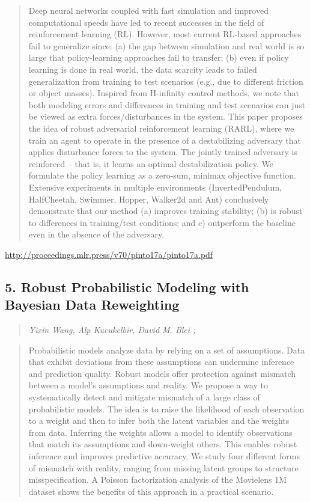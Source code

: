 \documentclass{article}
\begin{document}
\begin{quote}
    Deep neural networks coupled with fast simulation and improved computational speeds have led to recent successes in the field of reinforcement learning (RL). However, most current RL-based approaches fail to generalize since: (a) the gap between simulation and real world is so large that policy-learning approaches fail to transfer; (b) even if policy learning is done in real world, the data scarcity leads to failed generalization from training to test scenarios (e.g., due to different friction or object masses). Inspired from H-infinity control methods, we note that both modeling errors and differences in training and test scenarios can just be viewed as extra forces/disturbances in the system. This paper proposes the idea of robust adversarial reinforcement learning (RARL), where we train an agent to operate in the presence of a destabilizing adversary that applies disturbance forces to the system. The jointly trained adversary is reinforced – that is, it learns an optimal destabilization policy. We formulate the policy learning as a zero-sum, minimax objective function. Extensive experiments in multiple environments (InvertedPendulum, HalfCheetah, Swimmer, Hopper, Walker2d and Ant) conclusively demonstrate that our method (a) improves training stability; (b) is robust to differences in training/test conditions; and c) outperform the baseline even in the absence of the adversary.  
\end{quote}

\href{http://proceedings.mlr.press/v70/pinto17a/pinto17a.pdf}{http://proceedings.mlr.press/v70/pinto17a/pinto17a.pdf}

\subsection{5. Robust Probabilistic Modeling with Bayesian Data Reweighting}

\begin{quote}
\footnotesize{\textit{Yixin Wang, Alp Kucukelbir, David M. Blei ;}}

\end{quote}

\begin{quote}
    Probabilistic models analyze data by relying on a set of assumptions. Data that exhibit deviations from these assumptions can undermine inference and prediction quality. Robust models offer protection against mismatch between a model’s assumptions and reality. We propose a way to systematically detect and mitigate mismatch of a large class of probabilistic models. The idea is to raise the likelihood of each observation to a weight and then to infer both the latent variables and the weights from data. Inferring the weights allows a model to identify observations that match its assumptions and down-weight others. This enables robust inference and improves predictive accuracy. We study four different forms of mismatch with reality, ranging from missing latent groups to structure misspecification. A Poisson factorization analysis of the Movielens 1M dataset shows the benefits of this approach in a practical scenario.  
\end{quote}
\end{document}
